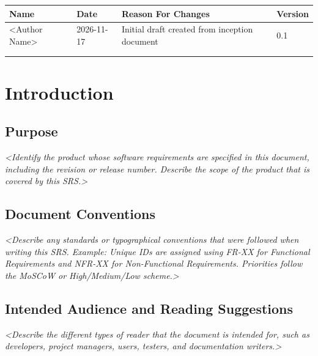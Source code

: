 \documentclass[11pt, a4paper]{article}
\newcommand{\guidance}[1]{\textit{\color{darkgray}<#1>}}
\begin{document}
\begin{tabularx}{\textwidth}{|p{3.2cm}|p{2.4cm}|X|p{2.2cm}|}
    \hline
    \textbf{Name} & \textbf{Date} & \textbf{Reason For Changes} & \textbf{Version} \\
    \hline\hline
    <Author Name> & 2026-11-17 & Initial draft created from inception document & 0.1 \\
    \hline
     & & & \\
    \hline
     & & & \\
    \hline
\end{tabularx}

\newpage

\setcounter{page}{1}

\section{Introduction}

\subsection{Purpose}
\guidance{Identify the product whose software requirements are specified in this document, including the revision or release number. Describe the scope of the product that is covered by this SRS.}

\subsection{Document Conventions}
\guidance{Describe any standards or typographical conventions that were followed when writing this SRS. Example: Unique IDs are assigned using FR-XX for Functional Requirements and NFR-XX for Non-Functional Requirements. Priorities follow the MoSCoW or High/Medium/Low scheme.}

\subsection{Intended Audience and Reading Suggestions}
\guidance{Describe the different types of reader that the document is intended for, such as developers, project managers, users, testers, and documentation writers.}
\end{document}
